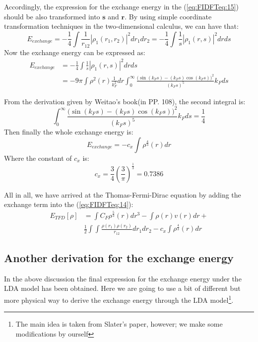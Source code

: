 Accordingly, the expression for the exchange energy in the
(\ref{eq:FIDFTeq:15}) should be also transformed into $\mathbf{s}$
and $\mathbf{r}$. By using simple coordinate transformation techniques
in the two-dimensional calculus, we can have that:
\begin{equation}
 E_{exchange}  = -\frac{1}{4}\int \frac{1}{r_{12}}
  |\rho_{1}(r_{1},r_{2})|^{2}dr_{1}dr_{2} = -\frac{1}{4}\int \frac{1}{s}
  |\rho_{1}(r,s)|^{2}drds 
\end{equation}
Now the exchange energy can be expressed as:
\begin{align}\label{eq:FIDFTeq:29}
 E_{exchange} &= -\frac{1}{4}\int \frac{1}{s}
  |\rho_{1}(r,s)|^{2}drds \nonumber \\
&=-9\pi\int\rho^{2}(r)\frac{1}{k_{F}^{2}}dr
\int_{0}^{\infty}\frac{\Big(\sin (k_{F}s)  - (k_{F}s)\cos
(k_{F}s)\Big)^{2}}{(k_{F}s)^{5}}k_{F}ds
\end{align}

From the derivation given by Weitao's book\cite{weitaoYang}(in
PP. 108), the second integral is:
\begin{equation}\label{}
\int_{0}^{\infty}\frac{\Big(\sin (k_{F}s)  - (k_{F}s)\cos
(k_{F}s)\Big)^{2}}{(k_{F}s)^{5}}k_{F}ds = \frac{1}{4}
\end{equation}
Then finally the whole exchange energy is:
\begin{equation}\label{eq:FIDFTeq:31}
 E_{exchange} = -c_{x}\int\rho^{\frac{4}{3}}(r)dr
\end{equation}
Where the constant of $c_{x}$ is:
\begin{equation}\label{}
c_{x} = \frac{3}{4}\left(\frac{3}{\pi}\right)^{\frac{1}{3}} = 0.7386
\end{equation}

All in all, we have arrived at the Thomas-Fermi-Dirac equation by
adding the exchange term into the (\ref{eq:FIDFTeq:14}):
\begin{align}\label{eq:FIDFTeq:30}
E_{TFD}[\rho] &= \int C_{F}\rho^{\frac{5}{3}}(r)dr^{3} - \int
\rho(r)v(r)dr + \nonumber \\
&\frac{1}{2}\int\int
\frac{\rho(r_{1})\rho(r_{2})}{r_{12}}dr_{1}dr_{2}
-c_{x}\int\rho^{\frac{4}{3}}(r)dr
\end{align}


\subsection{Another derivation for the exchange energy}
\label{sec:SPIFTEE_in_functional}
%
%
%
%
%
In the above discussion the final expression for the exchange energy
under the LDA model has been obtained. Here we are going to use a bit
of different but more physical way to derive the exchange energy
through the LDA model\footnote{The main idea is taken from Slater's
paper\cite{PhysRev.81.385}, however; we make some modifications by
ourself}.

